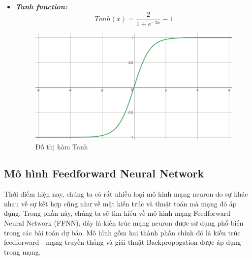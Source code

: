 \begin{itemize}
\begin{itemize}
			\item \textbf{\textit{Tanh function:}}
			\[Tanh(x) = \frac{2}{1 + e^{-2x}} - 1 \]
			\begin{figure}[h!]
				\centering
				\includegraphics[scale=0.2]{charts/tanh_fun.png}
				\caption{Đồ thị hàm Tanh}
				\label{fig:plot_tanh}			
			\end{figure}
			
		\end{itemize}
		
	\end{itemize}
	
	\subsection{Mô hình Feedforward Neural Network}
	
		Thời điểm hiện nay, chúng ta có rất nhiều loại mô hình mạng neuron do sự khác nhau về sự kết hợp cũng như về mặt kiến trúc và thuật toán mà mạng đó áp dụng. Trong phần này, chúng ta sẽ tìm hiểu về mô hình mạng Feedforward Neural Network (FFNN), đây là kiến trúc mạng neuron được sử dụng phổ biến trong các bài toán dự báo. Mô hình gồm hai thành phần chính đó là kiến trúc feedforward - mạng truyền thẳng và giải thuật Backpropogation được áp dụng trong mạng.
